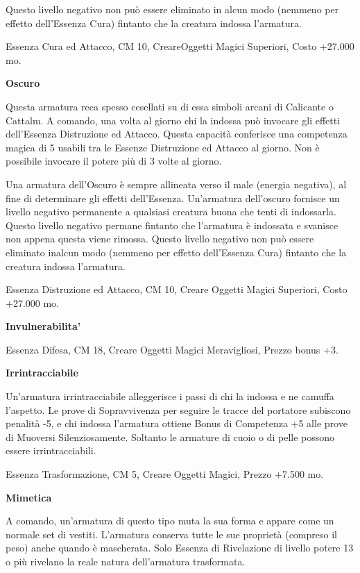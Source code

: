 \documentclass[a4paper,11pt,twoside,openany]{book}
\begin{document}
Questo livello negativo non può essere eliminato in alcun modo (nemmeno per effetto dell'Essenza Cura) fintanto che la creatura indossa l'armatura.

Essenza Cura ed Attacco, CM 10, CreareOggetti Magici Superiori, Costo +27.000 mo.

\textbf{Oscuro}

Questa armatura reca spesso cesellati su di essa simboli arcani di Calicante o Cattalm. A comando, una volta al giorno chi la indossa può invocare gli effetti dell'Essenza Distruzione ed Attacco. Questa capacità conferisce una competenza magica di 5 usabili tra le Essenze Distruzione ed Attacco al giorno. Non è possibile invocare il potere più di 3 volte al giorno.

Una armatura dell'Oscuro è sempre allineata verso il male (energia negativa), al fine di determinare gli effetti dell'Essenza. Un'armatura dell'oscuro fornisce un livello negativo permanente a qualsiasi creatura buona che tenti di indossarla. Questo livello negativo permane fintanto che l'armatura è indossata e svanisce non appena questa viene rimossa. Questo livello negativo non può essere eliminato inalcun modo (nemmeno per effetto dell'Essenza Cura) fintanto che la creatura indossa l'armatura.

Essenza Distruzione ed Attacco, CM 10, Creare Oggetti Magici Superiori,
Costo +27.000 mo.

\textbf{Invulnerabilita'}

Essenza Difesa, CM 18, Creare Oggetti Magici Meravigliosi, Prezzo bonus +3.

\textbf{Irrintracciabile}

Un'armatura irrintracciabile alleggerisce i passi di chi la indossa e ne camuffa l'aspetto. Le prove di Sopravvivenza per seguire le tracce del portatore subiscono penalità -5, e chi indossa l'armatura ottiene Bonus di Competenza +5 alle prove di Muoversi Silenziosamente. Soltanto le armature di cuoio o di pelle possono essere irrintracciabili.

Essenza Trasformazione, CM 5, Creare Oggetti Magici, Prezzo +7.500
mo.

\textbf{Mimetica}

A comando, un'armatura di questo tipo muta la sua forma e appare come un normale set di vestiti. L'armatura conserva tutte le sue proprietà (compreso il peso) anche quando è mascherata. Solo Essenza di Rivelazione di livello potere 13 o più rivelano la reale natura dell'armatura trasformata.
\end{document}
